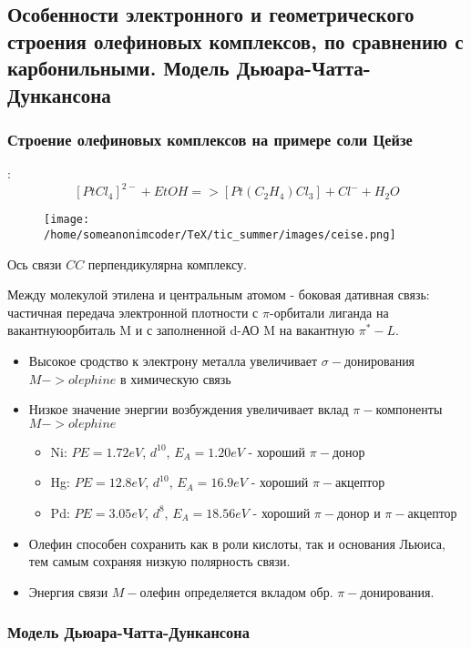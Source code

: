 \subsection{Особенности электронного и геометрического строения олефиновых комплексов, по сравнению с карбонильными. Модель Дьюара-Чатта-Дункансона}

\subsubsection*{Строение олефиновых комплексов на примере соли Цейзе}: 
$$[PtCl_4]^{2-} + EtOH => [Pt(C_2H_4)Cl_3] + Cl^- + H_2O$$

\begin{figure}[htp]
\centering
\texttt{[image: /home/someanonimcoder/TeX/tic\_summer/images/ceise.png]}
\end{figure}

Ось связи $CC$ перпендикулярна комплексу.

Между молекулой этилена и центральным атомом - боковая дативная связь: частичная передача электронной плотности с $\pi$-орбитали лиганда на вакантнуюорбиталь M и с заполненной d-АО M на вакантную $\pi^*-L$.

\begin{itemize}
	\item Высокое сродство к электрону металла увеличивает $\sigma-$донирования $M->olephine$ 	в химическую связь
	\item Низкое значение энергии возбуждения увеличивает вклад $\pi-$компоненты $M->olephine$
	\begin{itemize}
		\item Ni: $PE=1.72eV$, $d^{10}$, $E_A = 1.20eV$ - хороший $\pi-$донор
		\item Hg: $PE=12.8eV$, $d^{10}$, $E_A = 16.9eV$ - 	хороший $\pi-$акцептор
		\item Pd: $PE=3.05eV$, $d^{8}$, $E_A = 18.56eV$ - хороший $\pi-$донор и $\pi-$акцептор
	\end{itemize}
	\item Олефин способен сохранить как в роли кислоты, так и основания Льюиса, тем самым сохраняя низкую полярность связи.
	\item Энергия связи $M-$олефин определяется вкладом обр. $\pi-$донирования.
\end{itemize}

\subsubsection*{Модель Дьюара-Чатта-Дункансона}

